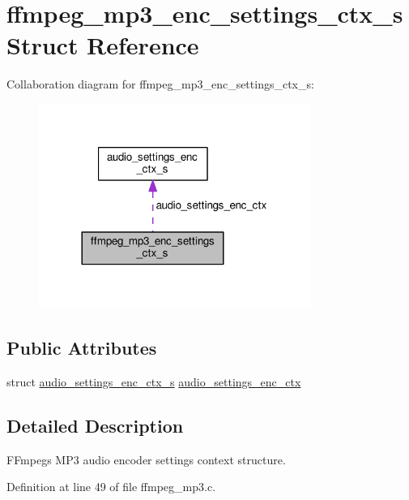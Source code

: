 \hypertarget{structffmpeg__mp3__enc__settings__ctx__s}{}\section{ffmpeg\+\_\+mp3\+\_\+enc\+\_\+settings\+\_\+ctx\+\_\+s Struct Reference}
\label{structffmpeg__mp3__enc__settings__ctx__s}


Collaboration diagram for ffmpeg\+\_\+mp3\+\_\+enc\+\_\+settings\+\_\+ctx\+\_\+s\+:\nopagebreak
\begin{figure}[H]
\begin{center}
\leavevmode
\includegraphics[width=252pt]{structffmpeg__mp3__enc__settings__ctx__s__coll__graph}
\end{center}
\end{figure}
\subsection*{Public Attributes}
\begin{DoxyCompactItemize}
\item 
struct \hyperlink{structaudio__settings__enc__ctx__s}{audio\+\_\+settings\+\_\+enc\+\_\+ctx\+\_\+s} \hyperlink{structffmpeg__mp3__enc__settings__ctx__s_a199ef797aa61bde0de50a9e09ed21f5c}{audio\+\_\+settings\+\_\+enc\+\_\+ctx}
\end{DoxyCompactItemize}


\subsection{Detailed Description}
F\+Fmpeg\textquotesingle{}s M\+P3 audio encoder settings context structure. 

Definition at line 49 of file ffmpeg\+\_\+mp3.\+c.



